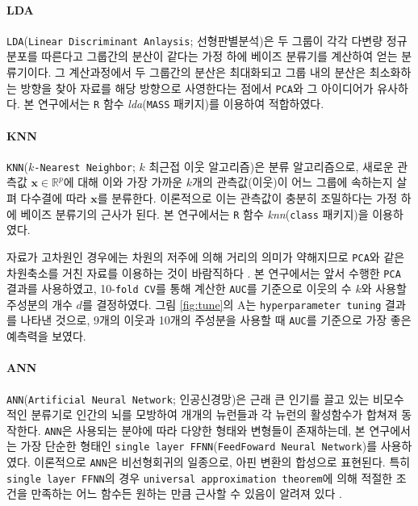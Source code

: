 \documentclass[11pt,onecolumn,twoside,a4size]{gsag3jnl}
\begin{document}
\paragraph{LDA} 

\texttt{LDA}(\texttt{Linear Discriminant Anlaysis}; 선형판별분석)은 두 그룹이 각각 다변량 정규분포를 따른다고 그룹간의 분산이 같다는 가정 하에 베이즈 분류기를 계산하여 얻는 분류기이다. 그 계산과정에서 두 그룹간의 분산은 최대화되고 그룹 내의 분산은 최소화하는 방향을 찾아 자료를 해당 방향으로 사영한다는 점에서 \texttt{PCA}와 그 아이디어가 유사하다. 본 연구에서는 \texttt{R} 함수 \textit{lda}(\texttt{MASS} 패키지)를 이용하여 적합하였다.

\paragraph{KNN}

\texttt{KNN}(\texttt{$k$-Nearest Neighbor}; $k$ 최근접 이웃 알고리즘)은 분류 알고리즘으로, 새로운 관측값 $\mathbf{x}\in\mathbb{R}^p$에 대해 이와 가장 가까운 $k$개의 관측값(이웃)이 어느 그룹에 속하는지 살펴 다수결에 따라 $\mathbf{x}$를 분류한다. 이론적으로 이는 관측값이 충분히 조밀하다는 가정 하에 베이즈 분류기의 근사가 된다. 본 연구에서는 \texttt{R} 함수 \textit{knn}(\texttt{class} 패키지)을 이용하였다.

자료가 고차원인 경우에는 차원의 저주에 의해 거리의 의미가 약해지므로 \texttt{PCA}와 같은 차원축소를 거친 자료를 이용하는 것이 바람직하다 \texttt{\citep{beyer1999nearest}}. 본 연구에서는 앞서 수행한 \texttt{PCA} 결과를 사용하였고, 10-\texttt{fold CV}를 통해 계산한 \texttt{AUC}를 기준으로 이웃의 수 $k$와 사용할 주성분의 개수 $d$를 결정하였다. 그림 \ref{fig:tune}의 A는 \texttt{hyperparameter tuning} 결과를 나타낸 것으로, 9개의 이웃과 10개의 주성분을 사용할 때 \texttt{AUC}를 기준으로 가장 좋은 예측력을 보였다.

\paragraph{ANN}

\texttt{ANN}(\texttt{Artificial Neural Network}; 인공신경망)은 근래 큰 인기를 끌고 있는 비모수적인 분류기로 인간의 뇌를 모방하여 개개의 뉴런들과 각 뉴런의 활성함수가 합쳐져 동작한다. \texttt{ANN}은 사용되는 분야에 따라 다양한 형태와 변형들이 존재하는데, 본 연구에서는 가장 단순한 형태인 \texttt{single layer FFNN}(\texttt{FeedFoward Neural Network})를 사용하였다. 이론적으로 \texttt{ANN}은 비선형회귀의 일종으로, 아핀 변환의 합성으로 표현된다. 특히 \texttt{single layer FFNN}의 경우 \texttt{universal approximation theorem}에 의해 적절한 조건을 만족하는 어느 함수든 원하는 만큼 근사할 수 있음이 알려져 있다 \texttt{\citep{leshno1993multilayer}}.
\end{document}
